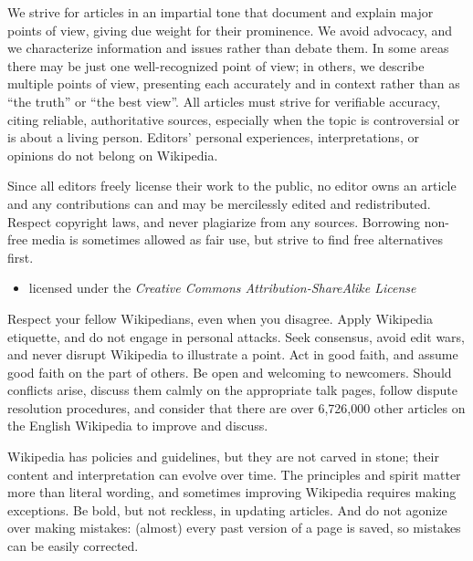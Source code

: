 \documentclass[a4paper,landscape,headrule,footrule,xetex]{foils}
\begin{document}
\begin{large}
We strive for articles in an impartial tone that document and explain
major points of view, giving due weight for their prominence. We avoid
advocacy, and we characterize information and issues rather than
debate them. In some areas there may be just one well-recognized point
of view; in others, we describe multiple points of view, presenting
each accurately and in context rather than as ``the truth'' or ``the best
view''. All articles must strive for verifiable accuracy, citing
reliable, authoritative sources, especially when the topic is
controversial or is about a living person. Editors' personal
experiences, interpretations, or opinions do not belong on Wikipedia.
\end{large}


\begin{large}
  Since all editors freely license their work to the public, no editor owns an article and any contributions can and may be mercilessly edited and redistributed. Respect copyright laws, and never plagiarize from any sources. Borrowing non-free media is sometimes allowed as fair use, but strive to find free alternatives first.
\end{large}

\begin{itemize}
\item licensed under the \textit{Creative Commons Attribution-ShareAlike License}
\end{itemize}



\begin{large}
  Respect your fellow Wikipedians, even when you disagree. Apply Wikipedia etiquette, and do not engage in personal attacks. Seek consensus, avoid edit wars, and never disrupt Wikipedia to illustrate a point. Act in good faith, and assume good faith on the part of others. Be open and welcoming to newcomers. Should conflicts arise, discuss them calmly on the appropriate talk pages, follow dispute resolution procedures, and consider that there are over 6,726,000 other articles on the English Wikipedia to improve and discuss.
\end{large}


\begin{large}
  Wikipedia has policies and guidelines, but they are not carved in stone; their content and interpretation can evolve over time. The principles and spirit matter more than literal wording, and sometimes improving Wikipedia requires making exceptions. Be bold, but not reckless, in updating articles. And do not agonize over making mistakes: (almost) every past version of a page is saved, so mistakes can be easily corrected.
\end{large}
\end{document}
